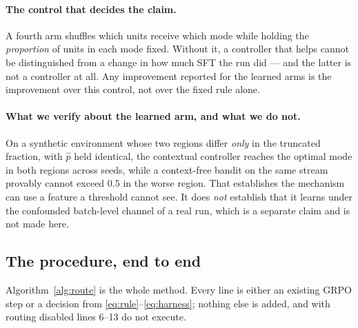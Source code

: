 \paragraph{The control that decides the claim.} A fourth arm shuffles which units receive
which mode while holding the \emph{proportion} of units in each mode fixed. Without it, a
controller that helps cannot be distinguished from a change in how much SFT the run did ---
and the latter is not a controller at all. Any improvement reported for the learned arms is
the improvement over this control, not over the fixed rule alone.

\paragraph{What we verify about the learned arm, and what we do not.} On a synthetic
environment whose two regions differ \emph{only} in the truncated fraction, with $\hat p$
held identical, the contextual controller reaches the optimal mode in both regions across
seeds, while a context-free bandit on the same stream provably cannot exceed $0.5$ in the
worse region. That establishes the mechanism can use a feature a threshold cannot see. It
does \emph{not} establish that it learns under the confounded batch-level channel of a real
run, which is a separate claim and is not made here.

\subsection{The procedure, end to end}
\label{sec:algo}

Algorithm~\ref{alg:route} is the whole method. Every line is either an existing GRPO step or
a decision from \eqref{eq:rule}--\eqref{eq:harness}; nothing else is added, and with routing
disabled lines 6--13 do not execute.

